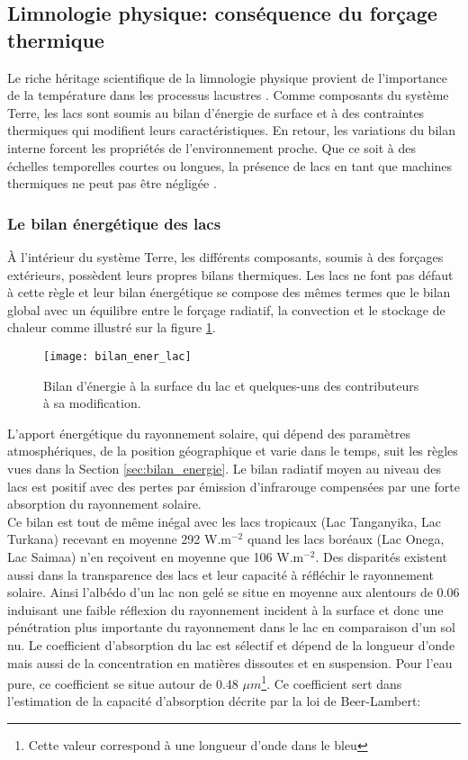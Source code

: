 \subsection{{\selectfont Limnologie physique: conséquence du forçage thermique}}
\label{sec:limno_physique}

Le riche héritage scientifique de la limnologie physique provient de l'importance de la température dans les processus lacustres \citep{adrian2009}. Comme composants du système Terre, les lacs sont soumis au bilan d'énergie de surface et à des contraintes thermiques qui modifient leurs caractéristiques. En retour, les variations du bilan interne forcent les propriétés de l'environnement proche. Que ce soit à des échelles temporelles courtes ou longues, la présence de lacs en tant que machines thermiques ne peut pas être négligée \citep{balsamo2017}.
\subsubsection{{\selectfont Le bilan énergétique des lacs}}

À l'intérieur du système Terre, les différents composants, soumis à des forçages extérieurs, possèdent leurs propres bilans thermiques. Les lacs ne font pas défaut à cette règle et leur bilan énergétique se compose des mêmes termes que le bilan global avec un équilibre entre le forçage radiatif, la convection et le stockage de chaleur comme illustré sur la figure \ref{ener_lac}. 

\begin{figure}[h!]
 \centering
 \texttt{[image: bilan\_ener\_lac]}
 \caption{Bilan d'énergie à la surface du lac et quelques-uns des contributeurs à sa modification.}
 \label{ener_lac}
\end{figure}


L'apport énergétique du rayonnement solaire, qui dépend des paramètres atmosphériques, de la position géographique et varie dans le temps, suit les règles vues dans la Section \ref{sec:bilan_energie}. Le bilan radiatif moyen au niveau des lacs est positif avec des pertes par émission d'infrarouge compensées par une forte absorption du rayonnement solaire. \\

Ce bilan est tout de même inégal avec les lacs tropicaux (Lac Tanganyika, Lac Turkana) recevant en moyenne 292 W.m$^{-2}$ quand les lacs boréaux (Lac Onega, Lac Saimaa) n'en reçoivent en moyenne que 106 W.m$^{-2}$. Des disparités existent aussi dans la transparence des lacs et leur capacité à réfléchir le rayonnement solaire. Ainsi l'albédo d'un lac non gelé se situe en moyenne aux alentours de 0.06 induisant une faible réflexion du rayonnement incident à la surface et donc une pénétration plus importante du rayonnement dans le lac en comparaison d'un sol nu. Le coefficient d'absorption du lac est sélectif et dépend de la longueur d'onde mais aussi de la concentration en matières dissoutes et en suspension. Pour l'eau pure, ce coefficient se situe autour de 0.48 $\mu m$\footnote{Cette valeur correspond à une longueur d'onde dans le bleu}. Ce coefficient sert dans l'estimation de la capacité d'absorption décrite par la loi de Beer-Lambert:

